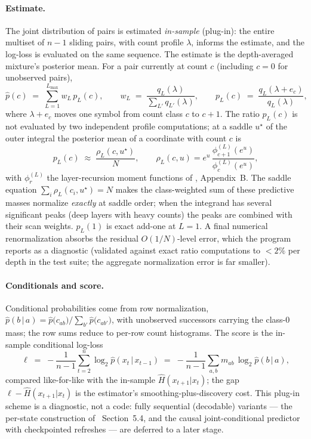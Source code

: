 \documentclass[11pt]{article}
\begin{document}
\paragraph{Estimate.}
The joint distribution of pairs is estimated \emph{in-sample}
(plug-in): the entire multiset of $n-1$ sliding pairs, with count profile
$\lambda$, informs the estimate, and the log-loss is evaluated on the same
sequence.  The estimate is the depth-averaged mixture's posterior mean.
For a pair currently at count $c$ (including $c=0$ for unobserved pairs),
\begin{equation}
\label{eq:predictive}
  \hat p(c) \;=\; \sum_{L=1}^{L_{\max}} w_L\, p_L(c),
  \qquad
  w_L \;=\; \frac{q_L(\lambda)}{\sum_{L'} q_{L'}(\lambda)},
  \qquad
  p_L(c) \;=\; \frac{q_L(\lambda + e_c)}{q_L(\lambda)},
\end{equation}
where $\lambda+e_c$ moves one symbol from count class $c$ to $c+1$.  The
ratio $p_L(c)$ is not evaluated by two independent profile computations;
at a saddle $u^\star$ of the outer integral the posterior mean of a
coordinate with count $c$ is
\[
  p_L(c) \;\approx\; \frac{\rho_L(c, u^\star)}{N},
  \qquad
  \rho_L(c,u) = e^{u}\,\frac{\phi^{(L)}_{c+1}(e^u)}{\phi^{(L)}_{c}(e^u)},
\]
with $\phi^{(L)}_r$ the layer-recursion moment functions of
\cite{layered2026}, Appendix~B.  The saddle equation
$\sum_i \rho_L(c_i,u^\star)=N$ makes the class-weighted sum of these
predictive masses normalize \emph{exactly} at saddle order; when the
integrand has several significant peaks (deep layers with heavy counts)
the peaks are combined with their scan weights.  $p_L(1)$ is exact add-one
at $L=1$.  A final numerical renormalization absorbs the residual
$O(1/N)$-level error, which the program reports as a diagnostic
(validated against exact ratio computations to $<2\%$ per depth in the
test suite; the aggregate normalization error is far smaller).

\paragraph{Conditionals and score.}
Conditional probabilities come from row normalization,
$\hat p(b\,|\,a) = \hat p\bigl(c_{ab}\bigr) / \sum_{b'} \hat
p\bigl(c_{ab'}\bigr)$, with unobserved successors carrying the class-$0$
mass; the row sums reduce to per-row count histograms.  The score is the
in-sample conditional log-loss
\[
  \ell \;=\; -\frac{1}{n-1}\sum_{t=2}^{n} \log_2 \hat p(x_t \,|\, x_{t-1})
  \;=\; -\frac{1}{n-1}\sum_{a,b} m_{ab}\, \log_2 \hat p(b\,|\,a),
\]
compared like-for-like with the in-sample $\hat H(x_{t+1}|x_t)$; the gap
$\ell - \hat H(x_{t+1}|x_t)$ is the estimator's smoothing-plus-discovery
cost.  This plug-in scheme is a diagnostic, not a code: fully sequential
(decodable) variants --- the per-state construction of
\cite{layered2026}~Section~5.4, and the causal joint-conditional predictor
with checkpointed refreshes --- are deferred to a later stage.
\end{document}
